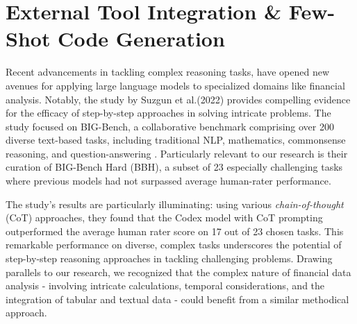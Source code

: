 \documentclass[logo,msc]{infthesis}           %
\begin{document}
\section{External Tool Integration \& Few-Shot Code Generation}
\label{Code Generation}


Recent advancements in tackling complex reasoning tasks, have opened new avenues for applying large language models to specialized domains like financial analysis. Notably, the study by Suzgun et al.(2022) provides compelling evidence for the efficacy of step-by-step approaches in solving intricate problems. The study focused on BIG-Bench, a collaborative benchmark comprising over 200 diverse text-based tasks, including traditional NLP, mathematics, commonsense reasoning, and question-answering \cite{suzgun2022challenging}. Particularly relevant to our research is their curation of BIG-Bench Hard (BBH), a subset of 23 especially challenging tasks where previous models had not surpassed average human-rater performance.

The study's results are particularly illuminating: using various \textit{chain-of-thought} (CoT) approaches, they found that the Codex model with CoT prompting outperformed the average human rater score on 17 out of 23 chosen tasks. This remarkable performance on diverse, complex tasks underscores the potential of step-by-step reasoning approaches in tackling challenging problems. Drawing parallels to our research, we recognized that the complex nature of financial data analysis - involving intricate calculations, temporal considerations, and the integration of tabular and textual data - could benefit from a similar methodical approach.
\end{document}
